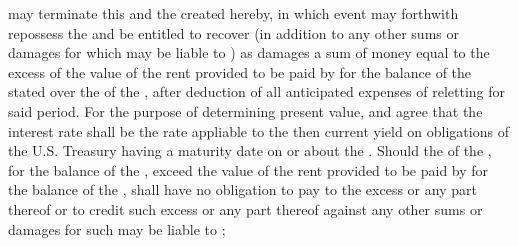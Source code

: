\lessor may terminate this \lease and the \termOfLease created hereby, in which event \lessor may forthwith repossess the \premises and be entitled to recover (in addition to any other sums or damages for which \lessee may be liable to \lessor) as damages a sum of money equal to the excess of the value of the rent provided to be paid by \lessee for the balance of the stated \termOfLease over the \fairMarketValue of the \premises, after deduction of all anticipated expenses of reletting for said period. For the purpose of determining present value, \lessor and \lessee agree that the interest rate shall be the rate appliable to the then current yield on obligations of the U.S. Treasury having a maturity date on or about the \expirationDate. Should the \fairMarketValue of the \premises, for the balance of the \termOfLease, exceed the value of the rent provided to be paid by \lessee for the balance of the \termOfLease, \lessor shall have no obligation to pay to \lessee the excess or any part thereof or to credit such excess or any part thereof against any other sums or damages for such \lessee may be liable to \lessor;

